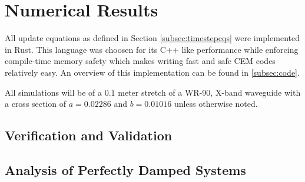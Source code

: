 \section{Numerical Results}
\label{sec:numres} 
All update equations as defined in Section \ref{subsec:timestepeqs} were implemented in Rust. This language was choosen for its C++ like performance while enforcing compile-time memory safety which makes writing fast and safe CEM codes relatively easy. An overview of this implementation can be found in \ref{subsec:code}.

All simulations will be of a $0.1$ meter stretch of a WR-90, X-band waveguide with a cross section of $a=0.02286$ and $b=0.01016$ \cite{everythingrf} unless otherwise noted.

\subsection{Verification and Validation}
\label{subsec:vv}


\subsection{Analysis of Perfectly Damped Systems}